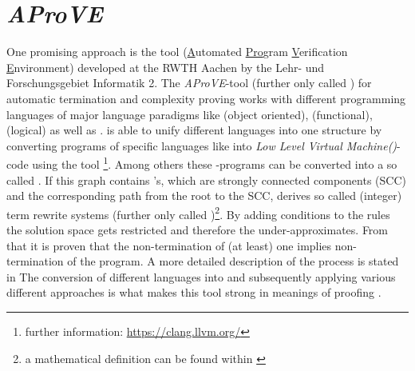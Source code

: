 \section{\emph{AProVE}}
\label{sec:aprove}
One promising approach is the tool \aprove (\underline{A}utomated \underline{Pro}gram \underline{V}erification \underline{E}nvironment) developed at the RWTH Aachen by the Lehr- und Forschungsgebiet Informatik 2. The \emph{AProVE}-tool (further only called \aprove) for automatic termination and complexity proving works with different programming languages of major language paradigms like  (object oriented),  (functional),  (logical) as well as . \newline
\aprove is able to unify different languages into one structure by converting programs of specific languages like  into \textit{Low Level Virtual Machine(\llvm)}-code using the tool  \footnote{further information: \url{https://clang.llvm.org/}}. Among others these \llvm-programs can be converted into a so called \seg. If this graph contains \lasso's, which are strongly connected components (SCC) and the corresponding path from the root to the SCC, \aprove derives so called (integer) term rewrite systems (further only called \its)\footnote{a mathematical definition can be found within \cite{fuhs2009proving}}. By adding conditions to the \its rules the solution space gets restricted and therefore the \its under-approximates. From that it is proven that the non-termination of (at least) one \its implies non-termination of the program. A more detailed description of the process is stated in \cite{hensel2017aprove} \newline
The conversion of different languages into \its and subsequently applying various different approaches is what makes this tool strong in meanings of proofing \cite{giesl2017analyzing}.

